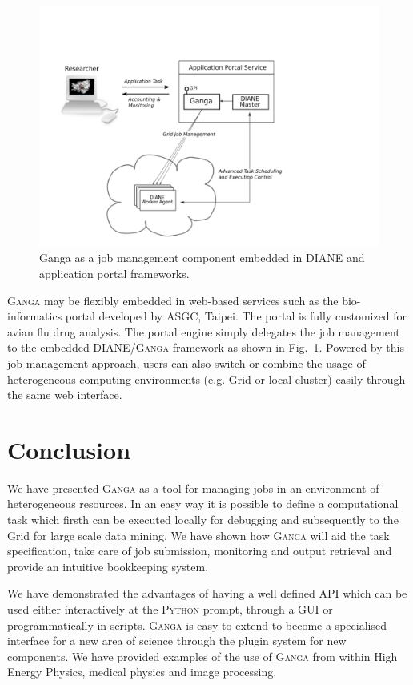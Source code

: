 \documentclass{elsart}
\def\ganga {\textsc{Ganga}\xspace}
\def\python {\textsc{Python}\xspace}
\def\diane {\textsc{DIANE}\xspace}
\def\grid {Grid\xspace}
\begin{document}
\begin{figure}
  \centering
  \includegraphics[width=1 \textwidth]{ganga-diane-portal.pdf}
  \caption{Ganga as a job management component embedded in DIANE and
    application portal frameworks.}
  \label{fig:webportal}
\end{figure}
\ganga may be flexibly embedded in web-based services such as the
bio-informatics portal developed by ASGC, Taipei. The portal is fully
customized for avian flu drug analysis.  The portal engine simply delegates
the job management to the embedded \diane/\ganga framework as shown in
Fig.~\ref{fig:webportal}. Powered by this job management approach, users can
also switch or combine the usage of heterogeneous computing environments (e.g.
\grid or local cluster) easily through the same web interface.

\section{Conclusion}
\label{sec:conclusion}
We have presented \ganga as a tool for managing jobs in an environment of
heterogeneous resources. In an easy way it is possible to define a
computational task which firsth can be executed locally for debugging and
subsequently to the \grid for large scale data mining. We have shown how \ganga
will aid the task specification, take care of job submission, monitoring and
output retrieval and provide an intuitive bookkeeping system.

We have demonstrated the advantages of having a well defined API which can be
used either interactively at the \python prompt, through a GUI or
programmatically in scripts. \ganga is easy to extend to become a specialised
interface for a new area of science through the plugin system for new
components. We have provided examples of the use of \ganga from within High
Energy Physics, medical physics and image processing.
\end{document}

